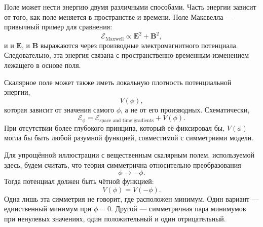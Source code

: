 \begin{classroomqa}
\end{classroomqa}

\begin{classroomqa}
\end{classroomqa}

Поле может нести энергию двумя различными способами. Часть энергии зависит от того, как поле меняется в пространстве и времени. Поле Максвелла — привычный пример для сравнения:
\begin{equation}
\mathcal{E}_{\mathrm{Maxwell}}\propto \mathbf E^2+\mathbf B^2,
\end{equation}
и и \(\mathbf E\), и \(\mathbf B\) выражаются через производные электромагнитного потенциала. Следовательно, эта энергия связана с пространственно-временным изменением лежащего в основе поля.

Скалярное поле может также иметь локальную плотность потенциальной энергии,
\begin{equation}
V(\phi),
\end{equation}
которая зависит от значения самого \(\phi\), а не от его производных. Схематически,
\begin{equation}
\mathcal{E}_\phi
=
\mathcal E_{\text{space and time gradients}}+V(\phi).
\end{equation}
При отсутствии более глубокого принципа, который её фиксировал бы, \(V(\phi)\) могла бы быть любой разумной функцией, совместимой с симметриями модели.

Для упрощённой иллюстрации с вещественным скалярным полем, используемой здесь, будем считать, что теория симметрична относительно преобразования
\begin{equation}
\phi\longrightarrow-\phi.
\end{equation}
Тогда потенциал должен быть чётной функцией:
\begin{equation}
V(\phi)=V(-\phi).
\end{equation}
Одна лишь эта симметрия не говорит, где расположен минимум. Один вариант — единственный минимум при \(\phi=0\). Другой — симметричная пара минимумов при ненулевых значениях, один положительный и один отрицательный.

